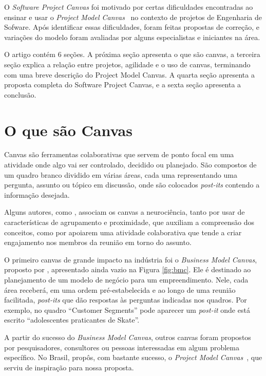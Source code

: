 \documentclass[a4]{report}
\begin{document}
O \textit{Software Project Canvas} foi motivado por certas dificuldades encontradas ao ensinar e usar o \textit{Project Model Canvas}~\citep{finocchio:2013} no contexto de projetos de Engenharia de Sofware. Após identificar essas dificuldades, foram feitas propostas de correção, e variações do modelo foram avaliadas por alguns especialistas e iniciantes na área.

O artigo contém 6 seções. A próxima seção apresenta o que são canvas, a terceira seção explica a relação entre projetos, agilidade e o uso de canvas, terminando com uma breve descrição do Project Model Canvas. A quarta seção apresenta a proposta completa do Software Project Canvas, e a sexta seção apresenta a conclusão.

\section{O que são Canvas}

Canvas são ferramentas colaborativas que servem de ponto focal em uma atividade onde algo vai ser controlado, decidido ou planejado. São compostos de um quadro branco dividido em várias áreas, cada uma representando uma pergunta, assunto ou tópico em discussão, onde são colocados \textit{post-its} contendo a informação desejada.

Alguns autores, como \citet{finocchio:2013}, associam os canvas a neurociência, tanto por usar de características de agrupamento e proximidade, que auxiliam a compreensão dos conceitos, como por apoiarem uma atividade colaborativa que tende a criar engajamento nos membros da reunião em torno do assunto.

O primeiro canvas de grande impacto na indústria foi o \textit{Business Model Canvas}, proposto por \citet{osterwalder2010business}, apresentado ainda vazio na Figura \ref{fig:bmc}. Ele é destinado ao planejamento de um modelo de negócio para um empreendimento. Nele, cada área receberá, em uma ordem pré-estabelecida e ao longo de uma reunião facilitada, \textit{post-its} que dão respostas às perguntas indicadas nos quadros. Por exemplo, no quadro ``Customer Segments'' pode aparecer um \textit{post-it} onde está escrito ``adolescentes praticantes de Skate''.

A partir do sucesso do \textit{Business Model Canvas},  outros canvas foram propostos por pesquisadores, consultores ou pessoas interessadas em algum problema específico. No Brasil, \citeauthor{finocchio:2013} propôs, com bastante sucesso, o \textit{Project Model Canvas}~\citep{finocchio:2013}, que serviu de inspiração para nossa proposta.
\end{document}

